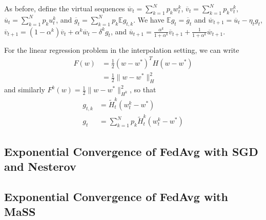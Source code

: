 As before, define the virtual sequences $\overline{w}_{t}=\sum_{k=1}^{N}p_{k}w_{t}^{k}$,
$\overline{v}_{t}=\sum_{k=1}^{N}p_{k}v_{t}^{k}$, $\overline{u}_{t}=\sum_{k=1}^{N}p_{k}u_{t}^{k}$,
and $\overline{g}_{t}=\sum_{k=1}^{N}p_{k}\mathbb{E}g_{t,k}$. We have
$\mathbb{E}g_{t}=\overline{g}_{t}$ and $\overline{w}_{t+1}=\overline{u}_{t}-\eta_{t}g_{t}$,
$\overline{v}_{t+1}=(1-\alpha^{k})\overline{v}_{t}+\alpha^{k}\overline{w}_{t}-\delta^{k}g_{t}$,
and $\overline{u}_{t+1}=\frac{\alpha^{k}}{1+\alpha^{k}}\overline{v}_{t+1}+\frac{1}{1+\alpha^{k}}\overline{w}_{t+1}$. 

For the linear regression problem in the interpolation setting, we
can write 
\begin{align*}
F(w) & =\frac{1}{2}(w-w^{\ast})^{T}H(w-w^{\ast})\\
 & =\frac{1}{2}\|w-w^{\ast}\|_{H}^{2}
\end{align*}
 and similarly $F^{k}(w)=\frac{1}{2}\|w-w^{\ast}\|_{H^{k}}^{2}$,
so that 
\begin{align*}
g_{t,k} & =\tilde{H}_{t}^{k}(w_{t}^{k}-w^{\ast})\\
g_{t} & =\sum_{k=1}^{N}p_{k}\tilde{H}_{t}^{k}(w_{t}^{k}-w^{\ast})
\end{align*}


\subsection{Exponential Convergence of FedAvg with SGD and Nesterov}

\subsection{Exponential Convergence of FedAvg with MaSS}

